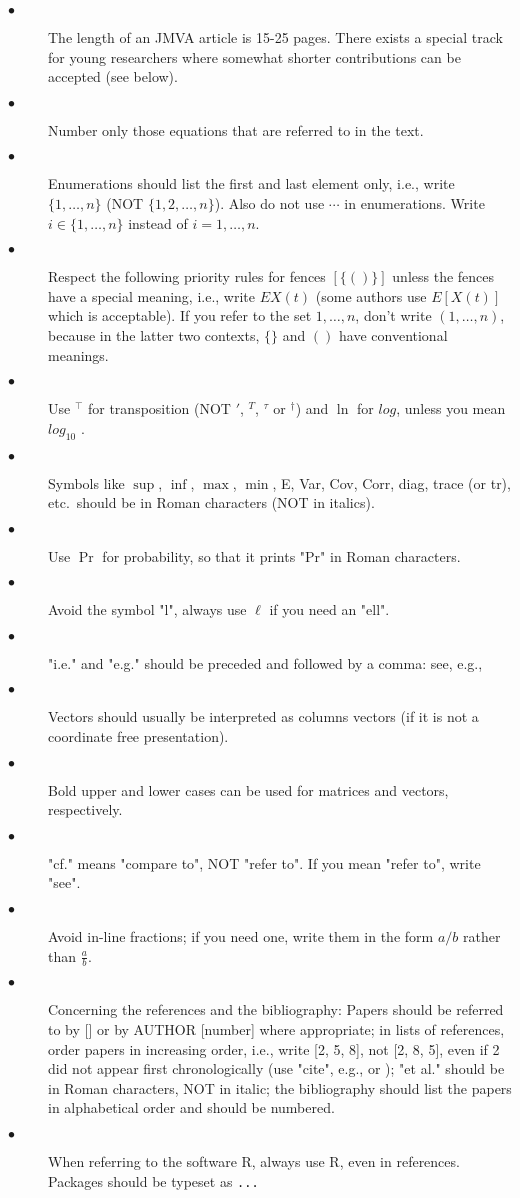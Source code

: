 \documentclass[times,sort&compress,3p]{elsarticle}
\theoremstyle{plain}%
\theoremstyle{definition}
\begin{document}
\noindent
\begin{description}
\item[$\bullet$] The length of an JMVA article is 15-25 pages. There exists a special track for young researchers where somewhat shorter contributions can be accepted (see below).
\item[$\bullet$]  Number only those equations that are referred to in the text.
\item[$\bullet$] Enumerations should list the first and last element only, i.e., write $\{1, \ldots, n\}$ (NOT $\{1, 2, \ldots , n\}$). Also do not use $\cdots$ in enumerations. Write $i\in\{1,\ldots, n\}$ instead of $i=1,\ldots, n$.
\item[$\bullet$] Respect the following priority rules for fences $[\{()\}]$ unless the fences have a special meaning, i.e., write $E{X(t)}$ (some authors use $E[X(t)]$ which is acceptable). If you refer to the set ${1,\ldots, n}$, don't write $(1,\ldots, n)$, because in the latter two contexts, $\{\}$ and $()$ have conventional meanings.
\item[$\bullet$] Use $^\top$ for transposition (NOT $'$, $^T$, $^\tau$ or $^\dagger$) and $\ln$ for $log$, unless you mean $log_{10}$ .
\item[$\bullet$] Symbols like $\sup$, $\inf$, $\max$, $\min$, E, Var, Cov, Corr, diag, trace (or tr), etc.~should be in Roman characters (NOT in italics).
\item[$\bullet$] Use $\Pr$ for probability, so that it prints "Pr" in Roman characters.
\item[$\bullet$] Avoid the symbol "l", always use $\ell$ if you need an "ell".
\item[$\bullet$] "i.e." and "e.g." should be preceded and followed by a comma:  see, e.g.,
\item[$\bullet$] Vectors should usually be interpreted as columns vectors (if it is not a coordinate free presentation).
\item[$\bullet$] Bold upper and lower cases can be used for matrices and vectors, respectively.
\item[$\bullet$] "cf." means "compare to", NOT "refer to". If you mean "refer to", write "see".
\item[$\bullet$] Avoid in-line fractions; if you need one, write them in the form $a/b$ rather than $\frac{a}{b}$.
\item[$\bullet$] Concerning the references and the bibliography:
Papers should be referred to by [] or by AUTHOR [number] where appropriate;
in lists of references, order papers in increasing order, i.e., write [2, 5, 8], not [2, 8, 5], even if 2 did not appear first chronologically (use "cite", e.g., \cite{Agresti13} or \cite{Agresti13,aitchison1958maximum}); "et al." should be in Roman characters, NOT in italic; the bibliography should list the papers in alphabetical order and should be numbered.
\item[$\bullet$] When referring to the software R, always use \textsf{R}, even in references. Packages should be typeset as \texttt{...}
\end{description}
\end{document}
